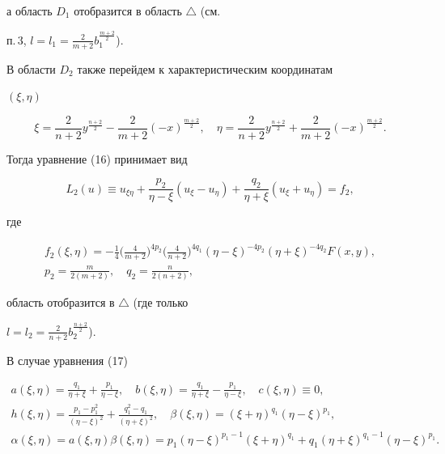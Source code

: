 а область $D_1$ отобразится в область ${\triangle }$ (см. 


п.\,3, $l=l_1=\frac{2}{m+2}b_1^{\frac{m+2}{2}}$).





В области $D_2$ также перейдем к характеристическим координатам


$(\xi,\eta)$


$$


\xi=\frac{2}{n+2}y^{\frac{n+2}{2}}-\frac{2}{m+2}(-x)^{\frac{m+


2}{2}},\quad \eta 


=\frac{2}{n+2}y^{\frac{n+2}{2}}+\frac{2}{m+2}(-x)^{\frac{m+2}{2}}.


$$


Тогда уравнение (16) принимает вид


\begin{equation}


L_2(u)\equiv u_{\xi \eta}+\frac{p_2}{\eta -\xi }(u_{\xi}-u_{\eta })


+\frac{q_2}{\eta +\xi}(u_{\xi }+u_{\eta })=f_2,


\end{equation}


где 


\begin{gather*}


f_2(\xi,\eta)=-\frac{1}{4}\bigg(\frac{4}{m+2}\bigg)^{4p_2}


\bigg(\frac{4}{n+2}\bigg)^{4q_1}(\eta-\xi)^{-4p_2}(\eta+\xi)^{-4q_2}F(x,y),\\


%


p_2=\frac{m}{2(m+2)},\quad q_2=\frac{n}{2(n+2)},


\end{gather*}


область отобразится в $\triangle $ (где только 


$l=l_2=\frac{2}{n+2}b_2^{\frac{n+2}{2}}$).





В случае уравнения (17)


\begin{gather*}


a(\xi,\eta)=\frac{q_1}{\eta +\xi }+\frac{p_1}{\eta -\xi},


\quad b(\xi,\eta)=\frac{q_1}{\eta +\xi }-\frac{p_1}{\eta 


-\xi },\quad c(\xi,\eta)\equiv 0,\\


%


h(\xi,\eta)=\frac{p_1-p_1^2}{(\eta -\xi )^2}


+\frac{q_1^2-q_1}{(\eta +\xi)^2},\quad \beta (\xi,\eta 


)=(\xi +\eta)^{q_1}(\eta -\xi)^{p_1},\\


%


\alpha(\xi,\eta)=a(\xi,\eta)\beta (\xi,\eta)=p_1(\eta 


-\xi)^{p_1-1}(\xi +\eta)^{q_1}+q_1(\eta +\xi)^{q_1-1}(\eta 


-\xi)^{p_1}.


\end{gather*}


